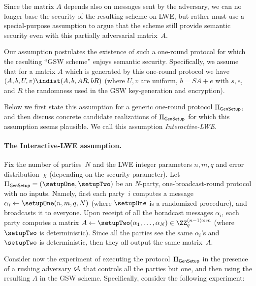 Since the matrix $A$ depends also on messages sent by the adversary, we can no longer base the security of the resulting scheme on LWE, but rather must use a special-purpose assumption to argue that the scheme still provide semantic security even with this partially adversarial matrix~$A$.

Our assumption postulates the existence of such a one-round protocol for which the resulting ``GSW scheme'' enjoys semantic security. Specifically, we assume that for a matrix $A$ which is generated by this one-round protocol we have $(A,b, U, v)\indist(A,b, AR,bR)$ (where $U,v$ are uniform, $b=SA+e$ with $s,e$, and $R$ the randomness used in the GSW key-generation and encryption).

Below we first state this assumption for a generic one-round protocol $\Pi_{\sf{GenSetup}}$, and then discuss concrete candidate realizations of $\Pi_{\sf{GenSetup}}$ for which this assumption seems plausible. We call this assumption \emph{Interactive-LWE}.

\paragraph{The Interactive-LWE assumption.}
Fix the number of parties~$N$ and the LWE integer parameters $n,m,q$ and error distribution~$\chi$ (depending on the security parameter). Let $\Pi_{\sf{GenSetup}}=(\setupOne,\setupTwo)$ be an $N$-party, one-broadcast-round protocol with no inputs. Namely, first each party~$i$ computes a message $\alpha_i\gets\setupOne(n,m,q,N)$ (where $\setupOne$ is a randomized procedure), and broadcasts it to everyone. Upon receipt of all the boradcast messages $\alpha_i$, each party computes a matrix $A\gets \setupTwo(\alpha_1,\ldots,\alpha_N) \in \ZZ_q^{(n-1)\times m}$ (where $\setupTwo$ is deterministic). Since all the parties see the same $\alpha_i$'s and $\setupTwo$ is deterministic, then they all output the same matrix~$A$.

\def\rA{{\sf r}\!{\cal A}}
Consider now the experiment of executing the protocol~$\Pi_{\sf{GenSetup}}$ in the presence of a rushing adversary $\rA$ that controls all the parties but one, and then using the resulting $A$ in the GSW scheme. Specifically, consider the following experiment:

